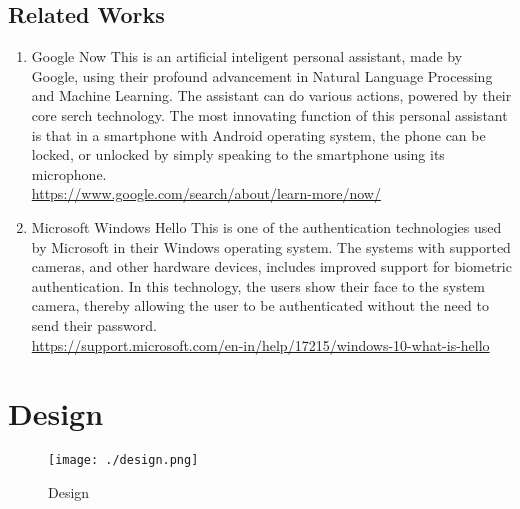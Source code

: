 \section{Related Works}
\begin{enumerate}
  \item{
    Google Now
    This is an artificial inteligent personal assistant, made by Google, using their profound advancement in Natural Language Processing and Machine Learning. The assistant can do various actions, powered by their core serch technology. The most innovating function of this personal assistant is that in a smartphone with Android operating system, the phone can be locked, or unlocked by simply speaking to the smartphone using its microphone.  \\
    \url{https://www.google.com/search/about/learn-more/now/}
  }
  \item{
    Microsoft Windows Hello
    This is one of the authentication technologies used by Microsoft in their Windows operating system. The systems with supported cameras, and other hardware devices, includes improved support for biometric authentication. In this technology, the users show their face to the system camera, thereby allowing the user to be authenticated without the need to send their password. \\
    \url{https://support.microsoft.com/en-in/help/17215/windows-10-what-is-hello}
  }
\end{enumerate}



\chapter{Design}

\begin{figure}[H]%
\centering
\texttt{[image: ./design.png]}
\caption{Design}
\label{fig:High_Level_Design}
\end{figure}


